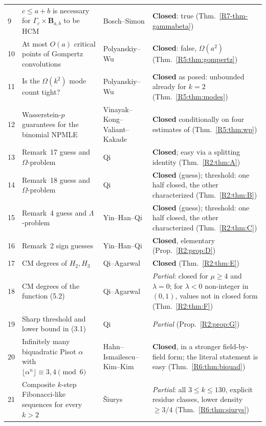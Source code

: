 \documentclass[11pt]{amsart}
\theoremstyle{definition}
\theoremstyle{remark}
\begin{document}
{\begin{longtable}{@{}p{}>{\raggedright\arraybackslash}p{}>{\raggedright\arraybackslash}p{}>{\raggedright\arraybackslash}p{}@{}}
9 & $c\le a+b$ is necessary for $\Gamma_c\times\mathbf B_{a,b}$ to be HCM & Bosch--Simon \cite{R7-BoschSimon16} & \textbf{Closed}: true (Thm.~\ref{R7-thm-gammabeta})\\
10 & At most $O(a)$ critical points of Gompertz convolutions & Polyanskiy--Wu \cite[\S5.2]{R5-PW20} & \textbf{Closed}: false, $\Omega(a^2)$ (Thm.~\ref{R5:thm:gompertz})\\
11 & Is the $\Omega(k^2)$ mode count tight? & Polyanskiy--Wu \cite[\S5.5]{R5-PW20} & \textbf{Closed} as posed: unbounded already for $k=2$ (Thm.~\ref{R5:thm:modes})\\
12 & Wasserstein-$p$ guarantees for the binomial NPMLE & Vinayak--Kong--Valiant--Kakade \cite[\S5]{R5-VKVK19} & \textbf{Closed} conditionally on four estimates of \cite{K-029} (Thm.~\ref{R5:thm:wp})\\
13 & Remark~17 guess and $\Omega$-problem & Qi \cite{R2-QiCR2022} & \textbf{Closed}; easy via a splitting identity (Thm.~\ref{R2:thm:A})\\
14 & Remark~18 guess and $\Omega$-problem & Qi \cite{R2-QiCR2022} & \textbf{Closed} (guess); threshold: one half closed, the other characterized (Thm.~\ref{R2:thm:B})\\
15 & Remark~4 guess and $\Lambda$-problem & Yin--Han--Qi \cite{R2-YHQ2024} & \textbf{Closed} (guess); threshold: one half closed, the other characterized (Thm.~\ref{R2:thm:C})\\
16 & Remark~2 sign guesses & Yin--Han--Qi \cite{R2-YHQ2024} & \textbf{Closed}, elementary (Prop.~\ref{R2:prop:D})\\
17 & CM degrees of $H_2,H_3$ & Qi--Agarwal \cite[\S5.4]{R2-QiAgarwal2019} & \textbf{Closed} (Thm.~\ref{R2:thm:E})\\
18 & CM degrees of the function (5.2) & Qi--Agarwal \cite[\S5.5]{R2-QiAgarwal2019} & \emph{Partial}: closed for $\mu\ge4$ and $\lambda=0$; for $\lambda<0$ non-integer in $(0,1)$, values not in closed form (Thm.~\ref{R2:thm:F})\\
19 & Sharp threshold and lower bound in (3.1) & Qi \cite[Rem.~4.1]{R2-QiMIA2021} & \emph{Partial} (Prop.~\ref{R2:prop:G})\\
20 & Infinitely many biquadratic Pisot $\alpha$ with $\lfloor\alpha^n\rfloor\equiv3,4\pmod6$ & Hahn--Ismailescu--Kim--Kim \cite[\S5]{R6-HIKK} & \textbf{Closed}, in a stronger field-by-field form; the literal statement is easy (Thm.~\ref{R6:thm:biquad})\\
21 & Composite $k$-step Fibonacci-like sequences for every $k>2$ & Šiurys \cite{R6-Siurys} & \emph{Partial}: all $3\le k\le130$, explicit residue classes, lower density $\ge3/4$ (Thm.~\ref{R6:thm:siurys})\\

\end{longtable}}
\end{document}
